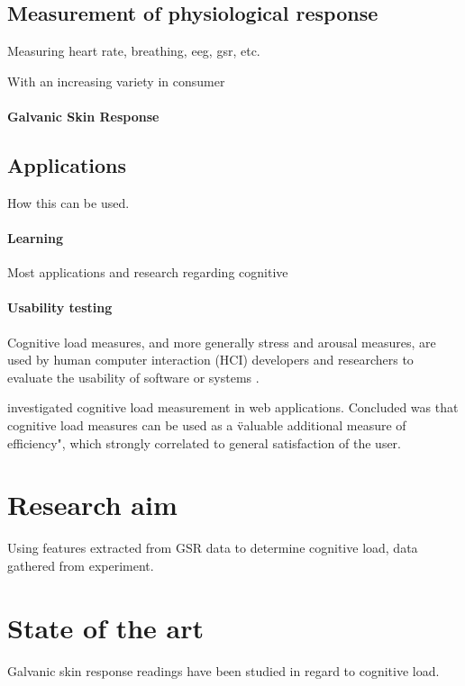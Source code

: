 \documentclass[12pt,leqno,letterpaper]{report} %
\begin{document}
\subsection{Measurement of physiological response}
Measuring heart rate, breathing, eeg, gsr, etc.

With an increasing variety in consumer 

\paragraph{Galvanic Skin Response}



\subsection{Applications}
How this can be used.

\paragraph{Learning}
Most applications and research regarding cognitive 


\paragraph{Usability testing}
Cognitive load measures, and more generally stress and arousal measures, are used by human computer interaction (HCI) developers and researchers to evaluate the usability of software or systems \citep{Jacob2003} \citep{Schmutz2009}.

\citep{Schmutz2009} investigated cognitive load measurement in web applications. Concluded was that cognitive load measures can be used as a \"valuable additional measure of efficiency", which strongly correlated to general satisfaction of the user. 



\section{Research aim}
Using features extracted from GSR data to determine cognitive load, data gathered from experiment.

\section{State of the art}
Galvanic skin response readings have been studied in regard to cognitive load.
\end{document}
